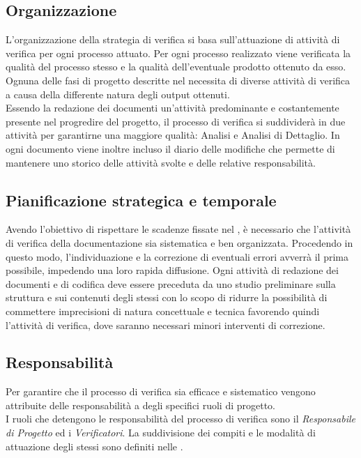 \subsection{Organizzazione}
L'organizzazione della strategia di verifica si basa sull'attuazione di attività di verifica per ogni processo attuato. Per ogni processo realizzato viene verificata la qualità del processo stesso e la qualità dell'eventuale prodotto ottenuto da esso.\\
Ognuna delle fasi di progetto descritte nel \textit{\PdP} necessita di diverse attività di verifica a causa della differente natura degli output ottenuti.\\
Essendo la redazione dei documenti un'attività predominante e costantemente presente nel progredire del progetto, il processo di verifica si suddividerà in due attività per garantirne una maggiore qualità: Analisi e Analisi di Dettaglio. In ogni documento viene inoltre incluso il diario delle modifiche che permette di mantenere uno storico delle attività svolte e delle relative responsabilità.

\subsection{Pianificazione strategica e temporale}
Avendo l'obiettivo di rispettare le scadenze fissate nel \textit{\PdP}, è necessario che l'attività di verifica della documentazione sia sistematica e ben organizzata. Procedendo in questo modo, l'individuazione e la correzione di eventuali errori avverrà il prima possibile, impedendo una loro rapida diffusione. Ogni attività di redazione dei documenti e di codifica deve essere preceduta da uno studio preliminare sulla struttura e sui contenuti degli stessi con lo scopo di ridurre la possibilità di commettere imprecisioni di natura concettuale e tecnica favorendo quindi l'attività di verifica, dove saranno necessari minori interventi di correzione.

\subsection{Responsabilità}
Per garantire che il processo di verifica sia efficace e sistematico vengono attribuite delle responsabilità a degli specifici ruoli di progetto.\\
I ruoli che detengono le responsabilità del processo di verifica sono il \textit{Responsabile di Progetto} ed i \textit{Verificatori}. La suddivisione dei compiti e le modalità di attuazione degli stessi sono definiti nelle \textit{\NdP}.


